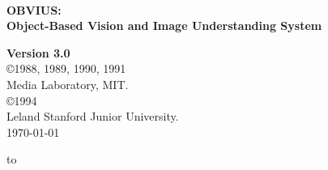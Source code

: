 \def\abox#1{{\tt <#1>}}
\def\res{{\tt ->}}  %

\def\ldef#1{{\tt #1} \index{{\tt #1},DEF}}
\def\lfun#1#2{{\tt ({\bf #1}#2)} \index{{\tt #1},DEF} \\}
\def\lmeth#1#2#3{{\tt ({\bf #1}#3)} \index{{\tt #1},{\it #2},DEF} \\}

\def\lsym#1{{\tt #1}\index{{\tt #1}}}    



\begin{titlepage}
\hbox{ }

\vfil

\begin{center}
{\Huge {\bf OBVIUS:}}\\
\bigskip
\bigskip
{\Large {\bf Object-Based Vision and Image Understanding System}} \\

\vfil
\vfil

{\Large {\bf Version 3.0}} \\
\bigskip
\bigskip
{\large
\copyright 1988, 1989, 1990, 1991 \\
Media Laboratory, MIT. \\
\medskip
\copyright 1994 \\
Leland Stanford Junior University. \\
\bigskip
\bigskip
\today
}
\vfil
\vfil

\hbox to \textwidth{\large \hfil David Heeger  \hfil  Eero Simoncelli \hfil
Eduardo-Jose Chichilnisky}

\vfil

\end{center}
\end{titlepage}

\newpage
\thispagestyle{empty}
\setcounter{page}{0}
\mbox{}		%
\newpage

\tableofcontents

\singlesp











%

\appendix





\clearpage\thispagestyle{empty}\cleardoublepage
{}
\makeatletter %



